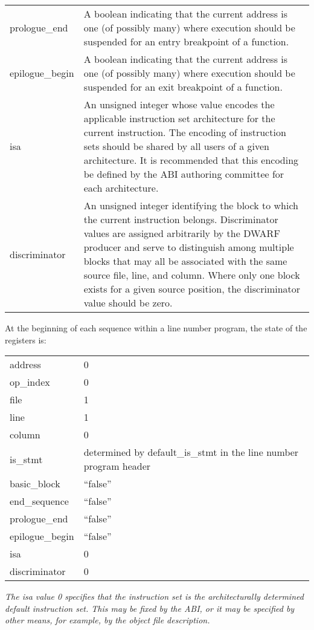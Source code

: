 \begin{longtable}{l|p{9cm}}
prologue\_end &
A boolean indicating that the current address is one (of possibly many)
where execution should be suspended for an entry breakpoint of a
function. \\

epilogue\_begin &
A boolean indicating that the current address is one (of possibly many)
where execution should be suspended for an exit breakpoint of a function. \\

isa &
An unsigned integer whose value encodes the applicable
instruction set architecture for the current instruction.
The encoding of instruction sets should be shared by all
users of a given architecture. It is recommended that this
encoding be defined by the ABI authoring committee for each
architecture. \\

discriminator &
An unsigned integer identifying the block to which the
current instruction belongs. Discriminator values are assigned
arbitrarily by the DWARF producer and serve to distinguish
among multiple blocks that may all be associated with the
same source file, line, and column. Where only one block
exists for a given source position, the discriminator value
should be zero. \\
\end{longtable}

At the beginning  of each sequence within a line number
program, the state of the registers is:

\begin{tabular}{lp{8cm}}
address & 0 \\
op\_index & 0 \\
file & 1 \\
line & 1 \\
column & 0 \\
is\_stmt & determined by default\_is\_stmt in the line number program header \\
basic\_block & ``false'' \\
end\_sequence & ``false'' \\
prologue\_end & ``false'' \\
epilogue\_begin & ``false'' \\
isa & 0 \\
discriminator & 0 \\
\end{tabular}

\textit{The isa value 0 specifies that the instruction set is the
architecturally determined default instruction set. This may
be fixed by the ABI, or it may be specified by other means,
for example, by the object file description.}

